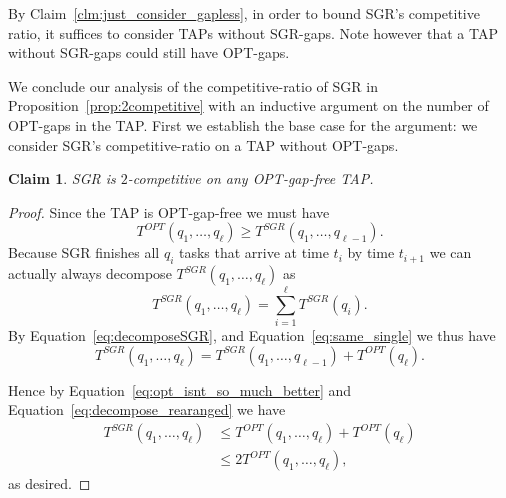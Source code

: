 \documentclass[twocolumn]{article}[10pt]
\newtheorem{claim}{Claim}
\begin{document}
By Claim~\ref{clm:just_consider_gapless}, in order to bound SGR's
competitive ratio, it suffices to consider TAPs
without SGR-gaps. Note however that a TAP without
SGR-gaps could still have OPT-gaps.

We conclude our analysis of the competitive-ratio of SGR in
Proposition~\ref{prop:2competitive} with an inductive argument on
the number of OPT-gaps in the TAP.
First we establish the base case for the argument: we consider
SGR's competitive-ratio on a TAP without OPT-gaps.  

\begin{claim}
  \label{clm:no_optgaps}
  SGR is $2$-competitive on any OPT-gap-free TAP.
\end{claim}
\begin{proof}
  Since the TAP is OPT-gap-free we must have
  \begin{equation}
    \label{eq:opt_isnt_so_much_better}
    T^{OPT}(q_1, \ldots, q_{\ell}) \ge T^{SGR}(q_1, \ldots, q_{\ell-1}).
  \end{equation}
  Because SGR finishes all $q_{i}$ tasks that arrive at time $t_i$
  by time $t_{i+1}$ we can actually always decompose
  $T^{SGR}(q_1, \ldots, q_\ell)$ as 
  \begin{equation}
    \label{eq:decomposeSGR}
    T^{SGR}(q_1, \ldots, q_\ell) = \sum_{i=1}^\ell T^{SGR}(q_i).
  \end{equation}
  By Equation~\eqref{eq:decomposeSGR}, and
  Equation~\eqref{eq:same_single} we thus have 
  \begin{equation}
    \label{eq:decompose_rearanged}
    T^{SGR}(q_1, \ldots, q_\ell) = T^{SGR}(q_1, \ldots, q_{\ell-1}) + T^{OPT}(q_\ell).
  \end{equation}

  Hence by Equation~\eqref{eq:opt_isnt_so_much_better} and
  Equation~\eqref{eq:decompose_rearanged} we have
  \begin{align*}
    T^{SGR}(q_1, \ldots, q_\ell) &\le T^{OPT}(q_1, \ldots, q_\ell) + T^{OPT}(q_\ell)\\
                                   &\le 2T^{OPT}(q_1, \ldots, q_\ell),
  \end{align*}
  as desired.
\end{proof}
\end{document}
